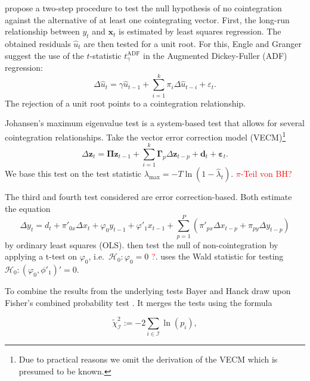 \documentclass[12pt,a4paper]{article}
\let\rmarkdownfootnote\footnote%
\def\footnote{\protect\rmarkdownfootnote}
\begin{document}
\textcite{Englegranger_1987} propose a two-step procedure to test the
null hypothesis of no cointegration against the alternative of at least
one cointegrating vector. First, the long-run relationship between
\(y_t\) and \(\mathbf{x}_t\) is estimated by least squares regression.
The obtained residuals \(\hat{u}_t\) are then tested for a unit root.
For this, Engle and Granger suggest the use of the \(t\)-statistic
\(t^{\text{ADF}}_\gamma\) in the Augmented Dickey-Fuller (ADF)
regression: \begin{equation}
\Delta \hat{u}_t = \gamma \hat{u}_{t-1} + \sum^{k}_{i=1} \pi_i \Delta \hat{u}_{t-i} + \varepsilon_t.
\label{eq:2}
\end{equation} The rejection of a unit root points to a cointegration
relationship.

Johansen's \autocite*{Johansen_1988} maximum eigenvalue test is a
system-based test that allows for several cointegration relationships.
Take the vector error correction model (VECM)\footnote{Due to practical
  reasons we omit the derivation of the VECM which is presumed to be
  known.} \begin{equation}
\Delta \mathbf{z}_t = \mathbf{\Pi z}_{t-1} + \sum^{k}_{i = 1} \mathbf{\Gamma}_p \Delta \mathbf{z}_{t-p} + \mathbf{d}_t + \mathbf{\varepsilon}_t.
\label{eq:3}
\end{equation} We base this test on the test statistic
\(\lambda_{\text{max}} = -T \ln(1 - \hat{\lambda}_t)\).
\textcolor{red}{$\pi$-Teil von BH?}

The third and fourth test considered are error correction-based. Both
estimate the equation \begin{equation}
\Delta y_t = d_t + \pi'_{0x} \Delta x_t + \varphi_0 y_{t-1} + \varphi'_1 x_{t-1} + \sum^P_{p=1} (\pi'_{px} \Delta x_{t-p} + \pi_{py} \Delta y_{t-p})
\label{eq:4}
\end{equation} by ordinary least squares (OLS). \textcite{Banerjee_1998}
then test the null of non-cointegration by applying a t-test on
\(\varphi_0\), i.e.~\(\mathcal{H}_0 : \varphi_0 = 0\)
\textcolor{red}{?}. \textcite{Boswijk_1994} uses the Wald statistic for
testing \(\mathcal{H}_0 : (\varphi_0, \phi'_1)' = 0\).

To combine the results from the underlying tests Bayer and Hanck draw
upon Fisher's combined probability test \autocite{Fisher_1932}. It
merges the tests using the formula

\begin{equation}
\tilde{\chi}^2_{\mathcal{I}} := -2 \sum_{i \in \mathcal{I}} \ln{(p_i)},
\label{eq:5}
\end{equation}
\end{document}
